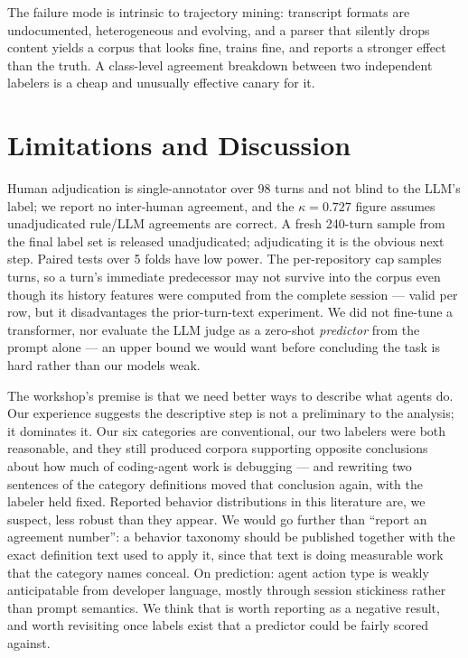 \documentclass[10pt]{article}
\begin{document}
The failure mode is intrinsic to trajectory mining: transcript formats are
undocumented, heterogeneous and evolving, and a parser that silently drops
content yields a corpus that looks fine, trains fine, and reports a stronger
effect than the truth. A class-level agreement breakdown between two independent
labelers is a cheap and unusually effective canary for it.

\section{Limitations and Discussion}

Human adjudication is single-annotator over 98 turns and not blind to the LLM's
label; we report no inter-human agreement, and the $\kappa = 0.727$ figure
assumes unadjudicated rule/LLM agreements are correct. A fresh 240-turn sample
from the final label set is released unadjudicated; adjudicating it is the
obvious next step. Paired tests over 5 folds have low power. The per-repository
cap samples turns, so a turn's immediate predecessor may not survive into the
corpus even though its history features were computed from the complete session
--- valid per row, but it disadvantages the prior-turn-text experiment. We did not
fine-tune a transformer, nor evaluate the LLM judge as a zero-shot
\emph{predictor} from the prompt alone --- an upper bound we would want before
concluding the task is hard rather than our models weak.

The workshop's premise is that we need better ways to describe what agents do.
Our experience suggests the descriptive step is not a preliminary to the
analysis; it dominates it. Our six categories are conventional, our two labelers
were both reasonable, and they still produced corpora supporting opposite
conclusions about how much of coding-agent work is debugging --- and rewriting two
sentences of the category definitions moved that conclusion again, with the
labeler held fixed. Reported behavior distributions in this literature are, we
suspect, less robust than they appear. We would go further than ``report an
agreement number'': a behavior taxonomy should be published together with the
exact definition text used to apply it, since that text is doing measurable work
that the category names conceal. On prediction: agent action type is weakly
anticipatable from developer language, mostly through session stickiness rather
than prompt semantics. We think that is worth reporting as a negative result, and
worth revisiting once labels exist that a predictor could be fairly scored
against.
\end{document}
